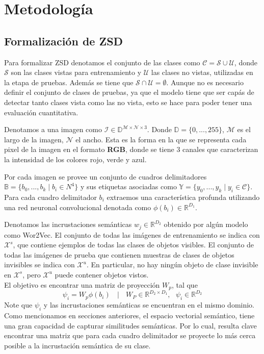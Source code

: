 \chapter{Metodología}\label{cap:metodologia}

\section{Formalización de ZSD} \label{ssec:formalizaciondezsd}
Para formalizar ZSD denotamos el conjunto de las clases como $\mathcal{C} = \mathcal{S} \cup \mathcal{U}$, donde $\mathcal{S}$ son las clases vistas para entrenamiento y $\mathcal{U}$ las clases no vistas, utilizadas en la etapa de pruebas. Además se tiene que $\mathcal{S} \cap \mathcal{U} = \emptyset$. Aunque no es necesario definir el conjunto de clases de pruebas, ya que el modelo tiene que ser capás de detectar tanto clases vista como las no vista, esto se hace para poder tener una evaluación cuantitativa.

Denotamos a una imagen como $\mathcal{I} \in \mathbb{D}^{\mathcal{M} \times \mathcal{N} \times 3}$. Donde $\mathbb{D} = \{0,...,255\}$, $\mathcal{M}$  es el largo de la imagen, $\mathcal{N}$ el ancho. Esta es la forma en la que se representa cada pixel de la imagen en el formato \textbf{RGB}, donde se tiene 3 canales que caracterizan la intensidad de los colores rojo, verde y azul. 

Por cada imagen se provee un conjunto de cuadros delimitadores  $\mathbb{B} = \{b_0,...,b_k\mid b_i \in N^4\}$ y sus etiquetas asociadas como $\mathbb{Y} = \{y_0,...,y_k\mid y_i \in \mathcal{C}\}$. Para cada cuadro delimitador $b_i$ extraemos una característica profunda utilizando una red neuronal convolucional denotada como $\phi(b_i) \in \mathbb{R}^{D_1}$. 

Denotamos las incrustaciones semánticas $w_j \in  \mathbb{R}^{D_2}$ obtenido por algún modelo como Wor2Vec. El conjunto de todas las imágenes de entrenamiento se indica con $\mathcal{X}^s$, que contiene ejemplos de todas las clases de objetos visibles.  El conjunto de todas las imágenes de prueba que contienen muestras de clases de objetos invisibles se indica con  $\mathcal{X}^u$. En particular, no hay ningún objeto de clase invisible en $\mathcal{X}^s$, pero $\mathcal{X}^u$ puede contener objetos vistos.\\

El objetivo es encontrar una matriz de proyección $W_p$, tal que \[ \psi_i = W_p\phi(b_i) \:\:\:\mid\:\:\: W_P \in \mathbb{R}^{D_2 \times D_1},\:\:\: \psi_i \in \mathbb{R}^{D_2} \] Note que $\psi_i$ y las incrustaciones semánticas se encuentran en el mismo dominio. Como mencionamos en secciones anteriores, el espacio vectorial semántico, tiene una gran capacidad de capturar similitudes semánticas. Por lo cual, resulta clave encontrar una matriz que para cada cuadro delimitador se proyecte lo más cerca posible a la incrustación semántica de su clase. 

